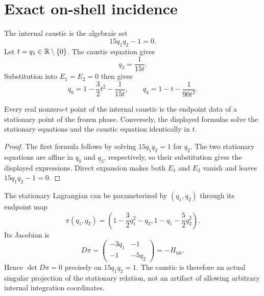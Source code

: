 \section{Exact on-shell incidence}

The internal caustic is the algebraic set
\[
 15q_1q_2-1=0.
\]
Let \(t=q_1\in\mathbb{R}\setminus\{0\}\).  The caustic equation gives
\[
 q_2=\frac{1}{15t}.
\]
Substitution into \(E_1=E_2=0\) then gives
\[
 q_0=1-\frac32t^2-\frac{1}{15t},
 \qquad
 q_3=1-t-\frac{1}{90t^2}.
\]

\begin{proposition}
Every real nonzero-\(t\) point of the internal caustic is the endpoint data of
a stationary point of the frozen phase.  Conversely, the displayed formulas
solve the stationary equations and the caustic equation identically in \(t\).
\end{proposition}

\begin{proof}
The first formula follows by solving \(15q_1q_2=1\) for \(q_2\).  The two
stationary equations are affine in \(q_0\) and \(q_3\), respectively, so their
substitution gives the displayed expressions.  Direct expansion makes both
\(E_1\) and \(E_2\) vanish and leaves \(15q_1q_2-1=0\).
\end{proof}

The stationary Lagrangian can be parameterized by \((q_1,q_2)\) through its
endpoint map
\[
 \pi(q_1,q_2)=\left(1-\frac32q_1^2-q_2,
                       1-q_1-\frac52q_2^2\right).
\]
Its Jacobian is
\[
 D\pi
 =\begin{pmatrix}-3q_1&-1\\-1&-5q_2\end{pmatrix}
 =-H_{\mathrm{int}}.
\]
Hence \(\det D\pi=0\) precisely on \(15q_1q_2=1\).  The caustic is therefore
an actual singular projection of the stationary relation, not an artifact of
allowing arbitrary internal integration coordinates.
